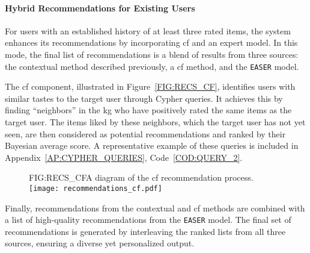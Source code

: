 \paragraph{Hybrid Recommendations for Existing Users}
For users with an established history of at least three rated items, the system enhances its recommendations by incorporating \acl{cf} and an expert model. In this mode, the final list of recommendations is a blend of results from three sources: the contextual method described previously, a \acl{cf} method, and the \texttt{EASER} model.

The \acl{cf} component, illustrated in Figure~\ref{FIG:RECS_CF}, identifies users with similar tastes to the target user through Cypher queries. It achieves this by finding ``neighbors'' in the \ac{kg} who have positively rated the same items as the target user. The items liked by these neighbors, which the target user has not yet seen, are then considered as potential recommendations and ranked by their Bayesian average score. A representative example of these queries is included in Appendix~\ref{AP:CYPHER_QUERIES}, Code~\ref{COD:QUERY_2}.

\begin{figure}[Collaborative Filtering Recommendations Diagram]{FIG:RECS_CF}{A diagram of the \acl{cf} recommendation process.}
    \texttt{[image: recommendations\_cf.pdf]}
\end{figure}

Finally, recommendations from the contextual and \acl{cf} methods are combined with a list of high-quality recommendations from the \texttt{EASER} model. The final set of recommendations is generated by interleaving the ranked lists from all three sources, ensuring a diverse yet personalized output.
